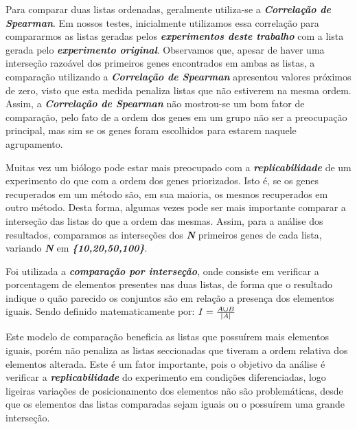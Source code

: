 Para comparar duas listas ordenadas, geralmente utiliza-se a \textsl{\textbf{Correlação de Spearman}}.
Em nossos testes, inicialmente utilizamos essa correlação para compararmos as listas geradas pelos \textsl{\textbf{experimentos deste trabalho}} com a lista gerada pelo \textsl{\textbf{experimento original}}.
%
Observamos que, apesar de haver uma interseção razoável dos primeiros genes encontrados em ambas as listas,  a comparação utilizando a \textsl{\textbf{Correlação de Spearman}} apresentou valores próximos de zero, visto que esta medida penaliza listas que não estiverem na mesma ordem.
%
Assim, a \textsl{\textbf{Correlação de Spearman}} não mostrou-se um bom fator de comparação, pelo fato de a ordem dos genes em um grupo não ser a preocupação principal, mas sim se os genes foram escolhidos para estarem naquele agrupamento.


Muitas vez um biólogo pode estar mais preocupado com a \textsl{\textbf{replicabilidade}} de um experimento do que com a ordem dos genes priorizados.
Isto é, se os genes recuperados em um método são, em sua maioria, os mesmos recuperados em outro método.
Desta forma, algumas vezes pode ser mais importante comparar a interseção das listas do que a ordem das mesmas.
Assim, para a análise dos resultados, comparamos as interseções dos \textsl{\textbf{N}} primeiros genes de cada lista, variando \textsl{\textbf{N}} em \textsl{\textbf{\{10,20,50,100\}}}.



Foi utilizada a \textsl{\textbf{comparação por interseção}}, onde consiste em verificar a porcentagem de elementos presentes nas duas listas, de forma que o resultado indique o quão parecido os conjuntos são em relação a presença dos elementos iguais.
Sendo definido matematicamente por: 
$I = {{A \cup B} \over |A|}$

Este modelo de comparação beneficia as listas que possuírem mais elementos iguais, porém não penaliza as listas seccionadas que tiveram a ordem relativa dos elementos alterada. Este é um fator importante, pois o objetivo da análise é verificar a \textsl{\textbf{replicabilidade}} do experimento em condições diferenciadas, logo ligeiras variações de posicionamento dos elementos não são problemáticas, desde que os elementos das listas comparadas sejam iguais ou o possuírem uma grande interseção.


